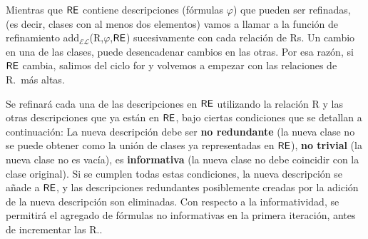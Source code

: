 Mientras que $\textsf{RE}$ contiene descripciones (f\'ormulas $\varphi$) que pueden ser refinadas, (es decir, clases
con al menos dos elementos) vamos a llamar a la funci\'on de refinamiento
add$_\mathcal{EL}$(R,$\varphi$,$\textsf{RE}$) sucesivamente con cada relaci\'on
de Rs. Un cambio en una de las clases, puede desencadenar cambios en
las otras. Por esa raz\'on, si $\textsf{RE}$ cambia, salimos del ciclo for y volvemos a
empezar con las relaciones de R.\puse\ m\'as altas. 

Se refinar\'a cada una de las descripciones
en $\textsf{RE}$ utilizando la relaci\'on R y las otras descripciones que ya est\'an en
$\textsf{RE}$, bajo ciertas condiciones que se detallan a continuaci\'on: 
La nueva descripci\'on debe ser
\textbf{no redundante} (la nueva clase no se puede obtener como la uni\'on de
clases ya representadas en $\textsf{RE}$), \textbf{no trivial} (la nueva
clase no es vac\'{i}a), es \textbf{informativa} (la nueva clase no debe
coincidir con la clase original). Si se cumplen todas estas condiciones,
la nueva descripci\'on se a\~nade a $\textsf{RE}$, y las descripciones redundantes
posiblemente creadas por la adici\'on de la nueva descripci\'on son
eliminadas.
Con respecto a la informatividad, se permitir\'a el agregado de f\'ormulas no informativas en la primera iteraci\'on, antes de incrementar las R.\puse.


